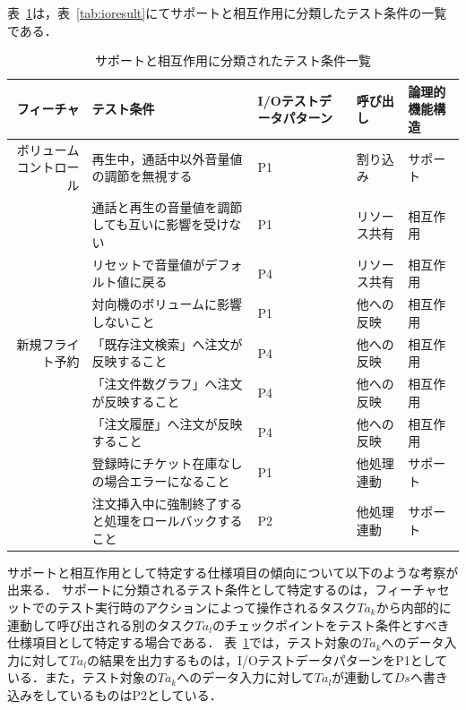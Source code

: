 表~\ref{tab:D-4-SandI}は，表~\ref{tab:ioresult}にてサポートと相互作用に分類したテスト条件の一覧である．

\begin{table}[htbp]
  \centering
  \caption{サポートと相互作用に分類されたテスト条件一覧}
    \begin{tabular}{|r|p{8em}|p{4em}|p{4em}|p{5em}|}
    \hline
    \multicolumn{1}{|p{5em}|}{フィーチャ} & テスト条件 & I/Oテストデータパターン & 呼び出し & 論理的機能構造 \bigstrut\\
    \hline
    \hline
    \multicolumn{1}{|p{4em}|}{ボリュームコントロール} & 再生中，通話中以外音量値の調節を無視する & P1　   & 割り込み  & サポート \bigstrut\\
\cline{2-5}          & 通話と再生の音量値を調節しても互いに影響を受けない & P1    & リソース共有 & 相互作用 \bigstrut\\
\cline{2-5}          & リセットで音量値がデフォルト値に戻る & P4　　  & リソース共有 & 相互作用 \bigstrut\\
    \cline{2-5}          & 対向機のボリュームに影響しないこと & P1　　  &  他への反映 & 相互作用 \bigstrut\\
    \hline
    \multicolumn{1}{|p{4em}|}{新規フライト予約} & 「既存注文検索」へ注文が反映すること & P4　   & 他への反映 & 相互作用 \bigstrut\\
\cline{2-5}          & 「注文件数グラフ」へ注文が反映すること & P4　   & 他への反映 & 相互作用 \bigstrut\\
\cline{2-5}          & 「注文履歴」へ注文が反映すること & P4    & 他への反映 & 相互作用 \bigstrut\\
\cline{2-5}          & 登録時にチケット在庫なしの場合エラーになること & P1    & 他処理連動 & サポート \bigstrut\\
\cline{2-5}          & 注文挿入中に強制終了すると処理をロールバックすること & P2    & 他処理連動 & サポート \bigstrut\\
    \hline
    \end{tabular}%
  \label{tab:D-4-SandI}%
\end{table}%

サポートと相互作用として特定する仕様項目の傾向について以下のような考察が出来る．
サポートに分類されるテスト条件として特定するのは，フィーチャセットでのテスト実行時のアクションによって操作されるタスク$Ta_k$から内部的に連動して呼び出される別のタスク$Ta_l$のチェックポイントをテスト条件とすべき仕様項目として特定する場合である．
表~\ref{tab:D-4-SandI}では，テスト対象の$Ta_k$へのデータ入力に対して$Ta_l$の結果を出力するものは，I/OテストデータパターンをP1としている．また，テスト対象の$Ta_k$へのデータ入力に対して$Ta_l$が連動して$Ds$へ書き込みをしているものはP2としている．

